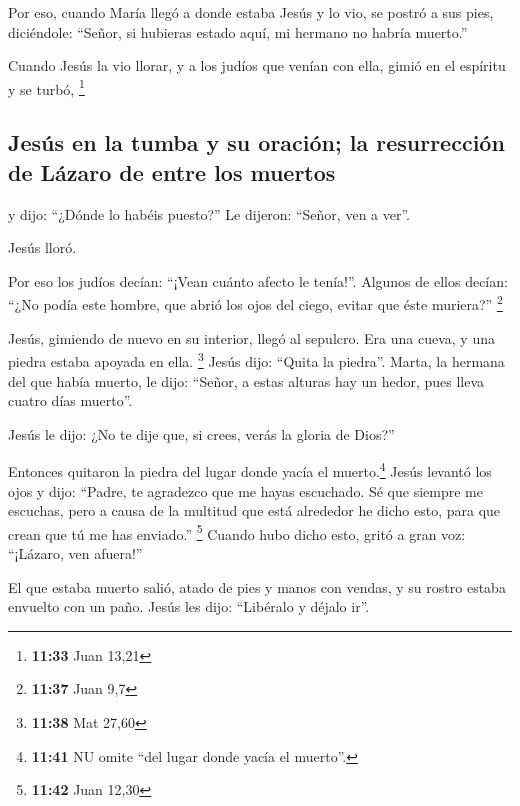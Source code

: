  Por eso, cuando María llegó a donde estaba Jesús y lo
vio, se postró a sus pies, diciéndole: ``Señor, si hubieras estado aquí,
mi hermano no habría muerto.''

 Cuando Jesús la vio llorar, y a los judíos que venían
con ella, gimió en el espíritu y se turbó, \footnote{\textbf{11:33} Juan
  13,21}

\hypertarget{jesuxfas-en-la-tumba-y-su-oraciuxf3n-la-resurrecciuxf3n-de-luxe1zaro-de-entre-los-muertos}{%
\subsection{Jesús en la tumba y su oración; la resurrección de Lázaro de
entre los
muertos}\label{jesuxfas-en-la-tumba-y-su-oraciuxf3n-la-resurrecciuxf3n-de-luxe1zaro-de-entre-los-muertos}}

 y dijo: ``¿Dónde lo habéis puesto?'' Le dijeron:
``Señor, ven a ver''.

 Jesús lloró.

 Por eso los judíos decían: ``¡Vean cuánto afecto le
tenía!''.  Algunos de ellos decían: ``¿No podía este
hombre, que abrió los ojos del ciego, evitar que éste muriera?''
\footnote{\textbf{11:37} Juan 9,7}

 Jesús, gimiendo de nuevo en su interior, llegó al
sepulcro. Era una cueva, y una piedra estaba apoyada en ella.
\footnote{\textbf{11:38} Mat 27,60}  Jesús dijo: ``Quita
la piedra''. Marta, la hermana del que había muerto, le dijo: ``Señor, a
estas alturas hay un hedor, pues lleva cuatro días muerto''.

 Jesús le dijo: ¿No te dije que, si crees, verás la
gloria de Dios?''

 Entonces quitaron la piedra del lugar donde yacía el
muerto.\footnote{\textbf{11:41} NU omite ``del lugar donde yacía el
  muerto''.} Jesús levantó los ojos y dijo: ``Padre, te agradezco que me
hayas escuchado.  Sé que siempre me escuchas, pero a
causa de la multitud que está alrededor he dicho esto, para que crean
que tú me has enviado.'' \footnote{\textbf{11:42} Juan 12,30}
 Cuando hubo dicho esto, gritó a gran voz: ``¡Lázaro, ven
afuera!''

 El que estaba muerto salió, atado de pies y manos con
vendas, y su rostro estaba envuelto con un paño. Jesús les dijo:
``Libéralo y déjalo ir''.

